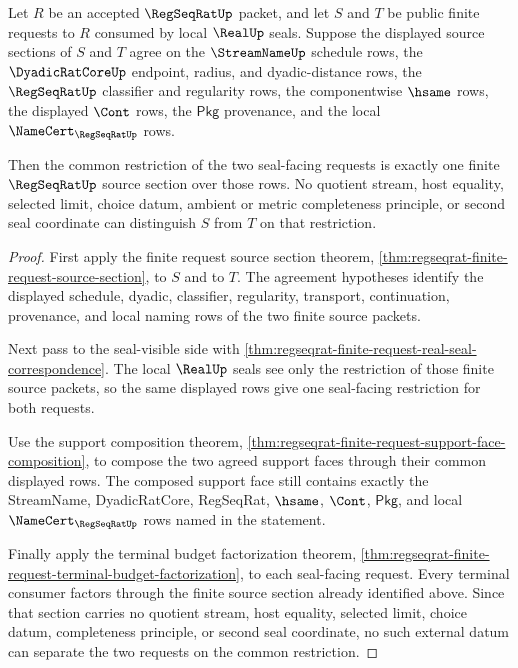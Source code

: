 \begin{theorem}
\label{thm:regseqrat-finite-request-source-section-intersection-lock}
Let $R$ be an accepted $\RegSeqRatUp$ packet, and let $S$ and $T$ be public
finite requests to $R$ consumed by local $\RealUp$ seals. Suppose the displayed
source sections of $S$ and $T$ agree on the $\StreamNameUp$ schedule rows, the
$\DyadicRatCoreUp$ endpoint, radius, and dyadic-distance rows, the
$\RegSeqRatUp$ classifier and regularity rows, the componentwise $\hsame$
rows, the displayed $\Cont$ rows, the $\mathsf{Pkg}$ provenance, and the local
$\NameCert_{\RegSeqRatUp}$ rows.

Then the common restriction of the two seal-facing requests is exactly one
finite $\RegSeqRatUp$ source section over those rows. No quotient stream, host
equality, selected limit, choice datum, ambient or metric completeness
principle, or second seal coordinate can distinguish $S$ from $T$ on that
restriction.
\end{theorem}
\begin{proof}
First apply the finite request source section theorem,
\autoref{thm:regseqrat-finite-request-source-section}, to $S$ and to $T$.
The agreement hypotheses identify the displayed schedule, dyadic, classifier,
regularity, transport, continuation, provenance, and local naming rows of the
two finite source packets.

Next pass to the seal-visible side with
\autoref{thm:regseqrat-finite-request-real-seal-correspondence}. The local
$\RealUp$ seals see only the restriction of those finite source packets, so
the same displayed rows give one seal-facing restriction for both requests.

Use the support composition theorem,
\autoref{thm:regseqrat-finite-request-support-face-composition}, to compose
the two agreed support faces through their common displayed rows. The composed
support face still contains exactly the StreamName, DyadicRatCore, RegSeqRat,
$\hsame$, $\Cont$, $\mathsf{Pkg}$, and local $\NameCert_{\RegSeqRatUp}$ rows
named in the statement.

Finally apply the terminal budget factorization theorem,
\autoref{thm:regseqrat-finite-request-terminal-budget-factorization}, to each
seal-facing request. Every terminal consumer factors through the finite source
section already identified above. Since that section carries no quotient
stream, host equality, selected limit, choice datum, completeness principle,
or second seal coordinate, no such external datum can separate the two
requests on the common restriction.
\end{proof}

